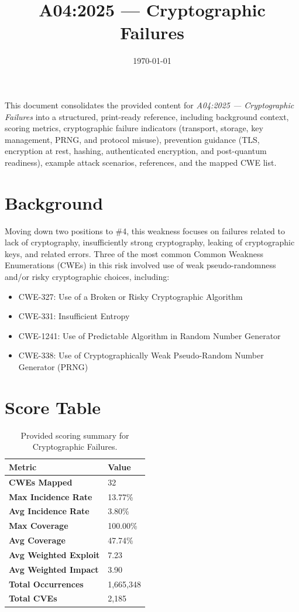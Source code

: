 \documentclass[11pt]{article}
\title{\textbf{A04:2025 — Cryptographic Failures}}
\author{} %
\date{\today}
\begin{document}
\maketitle

\begin{infobox}
This document consolidates the provided content for \textit{A04:2025 — Cryptographic Failures} into a structured, print-ready reference, including background context, scoring metrics, cryptographic failure indicators (transport, storage, key management, PRNG, and protocol misuse), prevention guidance (TLS, encryption at rest, hashing, authenticated encryption, and post-quantum readiness), example attack scenarios, references, and the mapped CWE list.
\end{infobox}

\tableofcontents
\newpage

\section{Background}
Moving down two positions to \#4, this weakness focuses on failures related to lack of cryptography, insufficiently strong cryptography, leaking of cryptographic keys, and related errors. Three of the most common Common Weakness Enumerations (CWEs) in this risk involved use of weak pseudo-randomness and/or risky cryptographic choices, including:
\begin{itemize}
  \item CWE-327: Use of a Broken or Risky Cryptographic Algorithm
  \item CWE-331: Insufficient Entropy
  \item CWE-1241: Use of Predictable Algorithm in Random Number Generator
  \item CWE-338: Use of Cryptographically Weak Pseudo-Random Number Generator (PRNG)
\end{itemize}

\section{Score Table}
\begin{table}[h!]
\centering
\renewcommand{\arraystretch}{1.2}
\begin{tabular}{@{}>{\bfseries}p{4.9cm}p{3.1cm}@{}}
\toprule
Metric & Value \\
\midrule
CWEs Mapped & 32 \\
Max Incidence Rate & 13.77\% \\
Avg Incidence Rate & 3.80\% \\
Max Coverage & 100.00\% \\
Avg Coverage & 47.74\% \\
Avg Weighted Exploit & 7.23 \\
Avg Weighted Impact & 3.90 \\
Total Occurrences & 1{,}665{,}348 \\
Total CVEs & 2{,}185 \\
\bottomrule
\end{tabular}
\caption{Provided scoring summary for Cryptographic Failures.}
\end{table}
\end{document}
